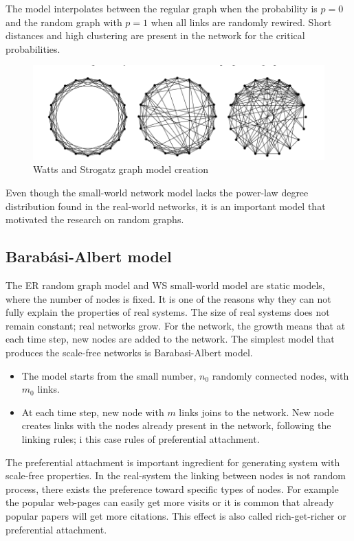 The model interpolates between the regular graph when the probability is $p=0$ and the random graph with $p=1$ when all links are randomly rewired. Short distances and high clustering are present in the network for the critical probabilities.

\begin{figure}[h!]
	\centering
	\includegraphics[width=0.9\linewidth]{figures/methodology/ws_graph}
	\caption{Watts and Strogatz graph model creation}
	\label{fig:erdist}
\end{figure}

Even though the small-world network model lacks the power-law degree distribution found in the real-world networks, it is an important model that motivated the research on random graphs. 

\subsection{Barab\' {a}si-Albert model}

The ER random graph model and WS small-world model are static models, where the number of nodes is fixed. It is one of the reasons why they can not fully explain the properties of real systems. The size of real systems does not remain constant; real networks grow. For the network, the growth means that at each time step, new nodes are added to the network. The simplest model that produces the scale-free networks is Barabasi-Albert model.

\begin{itemize}
	\item The model starts from the small number, $n_0$ randomly connected nodes, with $m_0$ links.
	\item At each time step, new node with $m$ links joins to the network. New node creates links with the nodes already present in the network, following the linking rules; i this case rules of preferential attachment. 
\end{itemize}
 
The preferential attachment is important ingredient for generating system with scale-free properties. In the real-system the linking between nodes is not random process, there exists the preference toward specific types of nodes. For example the popular web-pages can easily get more visits or it is common that already popular papers will get more citations. This effect is also called rich-get-richer or preferential attachment.

